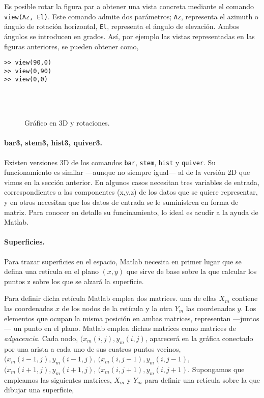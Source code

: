 Es posible rotar la figura par a obtener una vista concreta mediante el comando \texttt{view(Az, El)}. Este comando admite dos parámetros; \texttt{Az}, representa el azimuth o ángulo de rotación horizontal, \texttt{El}, representa el ángulo de elevación. Ambos ángulos se introducen en grados. Así, por ejemplo las vistas representadas en las figuras anteriores, se pueden obtener como,
\begin{verbatim}
>> view(90,0)
>> view(0,90)
>> view(0,0)
\end{verbatim}

\begin{figure}[h]
\centering
{} \qquad 
{}\\
\qquad
{}\\
\caption{Gráfico en 3D y rotaciones. }
\end{figure}

\paragraph{bar3, stem3, hist3, quiver3.} Existen versiones 3D de los comandos \texttt{bar}, \texttt{stem}, \texttt{hist} y \texttt{quiver}. Su funcionamiento es similar ---aunque no siempre igual--- al de la versión 2D que vimos en la sección anterior. En algunos casos necesitan tres variables de entrada, correspondientes a las componentes (x,y,z) de los datos que se quiere representar, y en otros necesitan que los datos de entrada se le suministren en forma de matriz. Para conocer en detalle su funcinamiento, lo ideal es acudir a la ayuda de Matlab.


\paragraph{Superficies.}Para trazar superficies en el espacio, Matlab necesita en primer lugar que se defina una retícula en el plano $(x,y)$ que sirve de base sobre la que calcular los puntos z sobre los que se alzará la superficie.

Para definir dicha retícula Matlab emplea dos matrices. una de ellas $X_m$ contiene las coordenadas $x$ de los nodos de la retícula y la otra $Y_m$ las coordenadas $y$. Los elementos que ocupan la misma posición en ambas matrices, representan ---juntos--- un punto en el plano.
Matlab emplea dichas matrices como matrices de \emph{adyacencia}. Cada nodo, $(x_m(i,j),y_m(i,j)$, aparecerá en la gráfica conectado por una arista a cada uno de sus cuatros puntos vecinos, $(x_m(i-1,j),y_m(i-1,j)$, $(x_m(i,j-1),y_m(i,j-1)$, $(x_m(i+1,j),y_m(i+1,j)$, $(x_m(i,j+1),y_m(i,j+1)$.
Supongamos que empleamos las siguientes matrices, $X_m$ y $Y_m$ para definir una retícula sobre la que dibujar una superficie,

